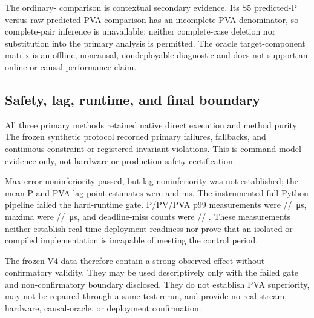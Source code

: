 The ordinary-\Ruckig{} comparison is contextual secondary evidence.  Its S5
predicted-P versus raw-predicted-PVA comparison has an incomplete PVA
denominator, so complete-pair inference is unavailable; neither complete-case
deletion nor substitution into the primary analysis is permitted.  The oracle
target-component matrix is an offline, noncausal, nondeployable diagnostic and
does not support an online or causal performance claim.

\begin{table}[H]
  \centering
  \caption{Frozen runtime measurements and contextual ordinary-\Ruckig{} and
  oracle evidence.  Runtime applies to the instrumented full Python pipeline;
  incomplete ordinary comparisons and noncausal oracle diagnostics do not
  replace the primary inference.}
  \label{tab:v4-runtime-context}
  \scriptsize
  
\end{table}

\subsection{Safety, lag, runtime, and final boundary}

All three primary methods retained native direct execution and method purity
\VFourDirectMethodPurityRate{}.  The frozen synthetic protocol recorded
\VFourPrimaryFailureCount{} primary failures,
\VFourFallbackEventCount{} fallbacks, and
\VFourContinuousConstraintViolationCount{} continuous-constraint or
registered-invariant violations.  This is command-model evidence only, not
hardware or production-safety certification.

Max-error noninferiority passed, but lag noninferiority was not established;
the mean P and PVA lag point estimates were \VFourPMeanLagMS{} and
\VFourPVAMeanLagMS{} ms.  The instrumented full-Python pipeline failed the
hard-runtime gate.  P/PV/PVA p99 measurements were
\VFourPRuntimePNinetyNineUS/\VFourPVRuntimePNinetyNineUS/%
\VFourPVARuntimePNinetyNineUS\,\si{\micro\second}, maxima were
\VFourPRuntimeMaxUS/\VFourPVRuntimeMaxUS/%
\VFourPVARuntimeMaxUS\,\si{\micro\second}, and deadline-miss counts were
\VFourPDeadlineMissCount/\VFourPVDeadlineMissCount/%
\VFourPVADeadlineMissCount.  These measurements neither establish real-time
deployment readiness nor prove that an isolated or compiled implementation is
incapable of meeting the control period.

The frozen V4 data therefore contain a strong observed effect without
confirmatory validity.  They may be used descriptively only with the failed
gate and non-confirmatory boundary disclosed.  They do not establish PVA
superiority, may not be repaired through a same-test rerun, and provide no
real-stream, hardware, causal-oracle, or deployment confirmation.
